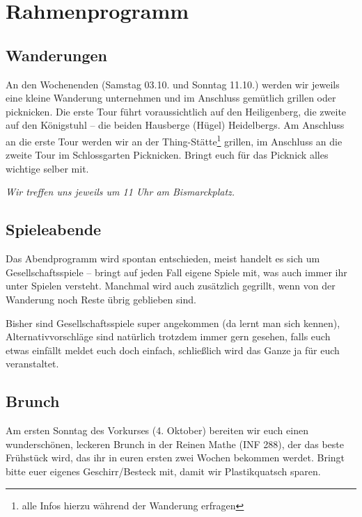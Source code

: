 \section{Rahmenprogramm}
\subsection{Wanderungen}
An den Wochenenden (Samstag 03.10. und Sonntag 11.10.) werden wir jeweils eine kleine Wanderung unternehmen und im Anschluss gemütlich grillen oder picknicken. Die erste Tour führt voraussichtlich auf den Heiligenberg, die zweite auf den Königstuhl -- die beiden Hausberge (Hügel) Heidelbergs. Am Anschluss an die erste Tour werden wir an der Thing-Stätte\footnote{alle Infos hierzu während der Wanderung erfragen} grillen, im Anschluss an die zweite Tour im Schlossgarten Picknicken. Bringt euch für das Picknick alles wichtige selber mit.

\noindent\emph{Wir treffen uns jeweils um 11 Uhr am Bismarckplatz.}

\subsection{Spieleabende}
Das Abendprogramm wird spontan entschieden, meist handelt es sich um Gesellschaftsspiele -- bringt auf jeden Fall eigene Spiele mit, was auch immer ihr unter Spielen versteht. Manchmal wird auch zusätzlich gegrillt, wenn von der Wanderung noch Reste übrig geblieben sind.

Bisher sind Gesellschaftsspiele super angekommen (da lernt man sich kennen), Alternativvorschläge sind natürlich trotzdem immer gern gesehen, falls euch etwas einfällt meldet euch doch einfach, schließlich wird das Ganze ja für euch veranstaltet.

\subsection{Brunch}
Am ersten Sonntag des Vorkurses (4. Oktober) bereiten wir euch einen wunderschönen, leckeren Brunch in der Reinen Mathe (\gls{INF} 288), der das beste Frühstück wird, das ihr in euren ersten zwei Wochen bekommen werdet. Bringt bitte euer eigenes Geschirr/Besteck mit, damit wir Plastikquatsch sparen.

\iffalse
